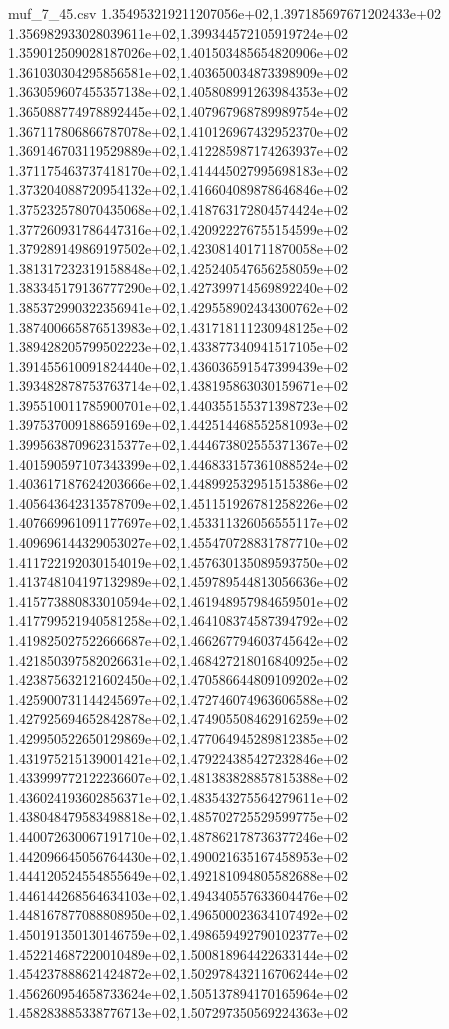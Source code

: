 \begin{filecontents*}{muf_7_45.csv}
1.354953219211207056e+02,1.397185697671202433e+02
1.356982933028039611e+02,1.399344572105919724e+02
1.359012509028187026e+02,1.401503485654820906e+02
1.361030304295856581e+02,1.403650034873398909e+02
1.363059607455357138e+02,1.405808991263984353e+02
1.365088774978892445e+02,1.407967968789989754e+02
1.367117806866787078e+02,1.410126967432952370e+02
1.369146703119529889e+02,1.412285987174263937e+02
1.371175463737418170e+02,1.414445027995698183e+02
1.373204088720954132e+02,1.416604089878646846e+02
1.375232578070435068e+02,1.418763172804574424e+02
1.377260931786447316e+02,1.420922276755154599e+02
1.379289149869197502e+02,1.423081401711870058e+02
1.381317232319158848e+02,1.425240547656258059e+02
1.383345179136777290e+02,1.427399714569892240e+02
1.385372990322356941e+02,1.429558902434300762e+02
1.387400665876513983e+02,1.431718111230948125e+02
1.389428205799502223e+02,1.433877340941517105e+02
1.391455610091824440e+02,1.436036591547399439e+02
1.393482878753763714e+02,1.438195863030159671e+02
1.395510011785900701e+02,1.440355155371398723e+02
1.397537009188659169e+02,1.442514468552581093e+02
1.399563870962315377e+02,1.444673802555371367e+02
1.401590597107343399e+02,1.446833157361088524e+02
1.403617187624203666e+02,1.448992532951515386e+02
1.405643642313578709e+02,1.451151926781258226e+02
1.407669961091177697e+02,1.453311326056555117e+02
1.409696144329053027e+02,1.455470728831787710e+02
1.411722192030154019e+02,1.457630135089593750e+02
1.413748104197132989e+02,1.459789544813056636e+02
1.415773880833010594e+02,1.461948957984659501e+02
1.417799521940581258e+02,1.464108374587394792e+02
1.419825027522666687e+02,1.466267794603745642e+02
1.421850397582026631e+02,1.468427218016840925e+02
1.423875632121602450e+02,1.470586644809109202e+02
1.425900731144245697e+02,1.472746074963606588e+02
1.427925694652842878e+02,1.474905508462916259e+02
1.429950522650129869e+02,1.477064945289812385e+02
1.431975215139001421e+02,1.479224385427232846e+02
1.433999772122236607e+02,1.481383828857815388e+02
1.436024193602856371e+02,1.483543275564279611e+02
1.438048479583498818e+02,1.485702725529599775e+02
1.440072630067191710e+02,1.487862178736377246e+02
1.442096645056764430e+02,1.490021635167458953e+02
1.444120524554855649e+02,1.492181094805582688e+02
1.446144268564634103e+02,1.494340557633604476e+02
1.448167877088808950e+02,1.496500023634107492e+02
1.450191350130146759e+02,1.498659492790102377e+02
1.452214687220010489e+02,1.500818964422633144e+02
1.454237888621424872e+02,1.502978432116706244e+02
1.456260954658733624e+02,1.505137894170165964e+02
1.458283885338776713e+02,1.507297350569224363e+02

\end{filecontents*}

